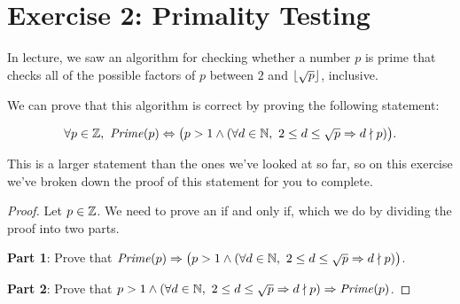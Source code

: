 \documentclass[14pt]{article}
\begin{document}
\newpage
\section*{Exercise 2: Primality Testing}

In lecture, we saw an algorithm for checking whether a number $p$ is prime that checks all of the possible factors of $p$ between $2$ and $\lfloor \sqrt{p} \rfloor$, inclusive.

We can prove that this algorithm is correct by proving the following statement:

$$\forall p \in \mathbb{Z},~ \mathit{Prime}(p) \Leftrightarrow \big(p > 1 \land (\forall d \in \mathbb{N},~ 2 \leq d \leq \sqrt{p} \Rightarrow d \nmid p) \big).$$

This is a larger statement than the ones we've looked at so far, so on this exercise we've broken down the proof of this statement for you to complete.

\begin{proof}
Let $p \in \mathbb{Z}$. We need to prove an if and only if, which we do by dividing the proof into two parts.

\textbf{Part 1}: Prove that $\mathit{Prime}(p) \Rightarrow \big(p > 1 \land (\forall d \in \mathbb{N},~ 2 \leq d \leq \sqrt{p} \Rightarrow d \nmid p) \big)$.





\textbf{Part 2}: Prove that $p > 1 \land (\forall d \in \mathbb{N},~ 2 \leq d \leq \sqrt{p} \Rightarrow d \nmid p) \Rightarrow \mathit{Prime}(p)$.







\end{proof}
\end{document}
